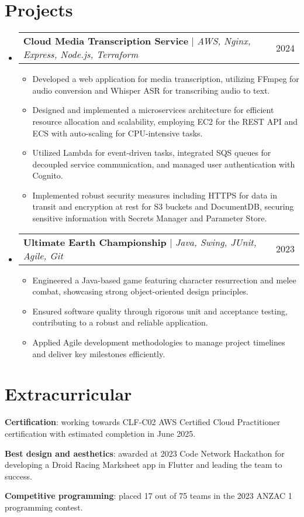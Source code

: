 \documentclass[letterpaper,11pt]{article}
\makeatletter
\newcommand{\resumeItem}[1]{
  \item\small{
    {#1 \vspace{-2pt}}
  }
}
\newcommand{\resumeProjectHeading}[2]{
    \item
    \begin{tabular*}{0.97\textwidth}{l@{\extracolsep{\fill}}r}
      \small#1 & #2 \\
    \end{tabular*}\vspace{-7pt}
}
\newcommand{\resumeSubHeadingListStart}{\begin{itemize}[leftmargin=0.15in, label={}]}
\newcommand{\resumeSubHeadingListEnd}{\end{itemize}}
\newcommand{\resumeItemListStart}{\begin{itemize}}
\newcommand{\resumeItemListEnd}{\end{itemize}\vspace{-5pt}}
\makeatother
\begin{document}
\section{Projects}
    \resumeSubHeadingListStart
        \resumeProjectHeading
            {\textbf{Cloud Media Transcription Service} $|$ \emph{AWS, Nginx, Express, Node.js, Terraform}}{2024}
        \resumeItemListStart
            \resumeItem{Developed a web application for media transcription, utilizing FFmpeg for audio conversion and Whisper ASR for transcribing audio to text.}
            \resumeItem{Designed and implemented a microservices architecture for efficient resource allocation and scalability, employing EC2 for the REST API and ECS with auto-scaling for CPU-intensive tasks.}
            \resumeItem{Utilized Lambda for event-driven tasks, integrated SQS queues for decoupled service communication, and managed user authentication with Cognito.}
            \resumeItem{Implemented robust security measures including HTTPS for data in transit and encryption at rest for S3 buckets and DocumentDB, securing sensitive information with Secrets Manager and Parameter Store.}
        \resumeItemListEnd
          
    \resumeProjectHeading
        {\textbf{Ultimate Earth Championship} $|$ \emph{Java, Swing, JUnit, Agile, Git}}{2023}
        \resumeItemListStart
            \resumeItem{Engineered a Java-based game featuring character resurrection and melee combat, showcasing strong object-oriented design principles.}
            \resumeItem{Ensured software quality through rigorous unit and acceptance testing, contributing to a robust and reliable application.}
            \resumeItem{Applied Agile development methodologies to manage project timelines and deliver key milestones efficiently.}
        \resumeItemListEnd
          
    \resumeSubHeadingListEnd

    


\section{Extracurricular}
 \begin{itemize}[leftmargin=0.15in, label={}]
    \small{\item{
     \textbf{Certification}{: working towards CLF-C02 AWS Certified Cloud Practitioner certification with estimated completion in June 2025.}
    }}
    \small{\item{
     \textbf{Best design and aesthetics}{: awarded at 2023 Code Network Hackathon for developing a Droid Racing Marksheet app in Flutter and leading the team to success.}
     }}
    \small{\item{
     \textbf{Competitive programming}{: placed 17 out of 75 teams in the 2023 ANZAC 1 programming contest.}
    }}
 \end{itemize}
 
\end{document}
